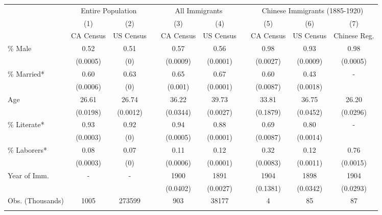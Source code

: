 \begin{tabular}{lccccccccc}
    \hhline{==========}
    & \multicolumn{2}{c}{Entire Population} & & \multicolumn{2}{c}{All Immigrants} & & \multicolumn{3}{c}{Chinese Immigrants (1885-1920)} \\ 
    \hhline{~--~--~---}
    & (1) & (2) & & (3) & (4) & & (5) & (6) & (7) \\ 
    & CA Census & US Census & & CA Census & US Census & & CA Census & US Census & Chinese Reg. \\ 
     \hhline{----------}
    \% Male & 0.52&0.51&&0.57&0.56&&0.98&0.93&0.98 \\ 
    & (0.0005)&(0)&&(0.0009)&(0.0001)&&(0.0027)&(0.0009)&(0.0005) \\ 
    \% Married* & 0.60&0.63&&0.65&0.67&&0.60&0.43&- \\ 
    & (0.0006)&(0)&&(0.001)&(0.0001)&&(0.0087)&(0.0018)& \\ 
    Age & 26.61&26.74&&36.22&39.73&&33.81&36.75&26.20 \\ 
    & (0.0198)&(0.0012)&&(0.0344)&(0.0027)&&(0.1879)&(0.0452)&(0.0296) \\ 
    \% Literate* & 0.93&0.92&&0.94&0.88&&0.69&0.80&- \\ 
    & (0.0003)&(0)&&(0.0005)&(0.0001)&&(0.0087)&(0.0014)& \\ 
    \% Laborers* & 0.08&0.07&&0.11&0.12&&0.32&0.12&0.76 \\ 
    & (0.0003)&(0)&&(0.0006)&(0.0001)&&(0.0083)&(0.0011)&(0.0015) \\ 
    Year of Imm. & -&-&&1900&1891&&1904&1898&1904 \\ 
    & &&&(0.0402)&(0.0027)&&(0.1381)&(0.0342)&(0.0293) \\ 
    Obs. (Thousands)
    &
    1005&273599&&903&38177&&4&85&87
    \\ 
    \hhline{----------}
    \end{tabular}
    